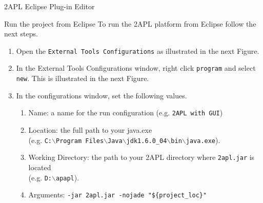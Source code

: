 \begin{chapter}{2APL Eclipse Plug-in Editor}
\begin{section}{Run the project from Eclipse}
    To run the 2APL platform from Eclipse follow the next steps.
    \begin{enumerate}
    \item Open the \texttt{External Tools Configurations} as
    illustrated in the next Figure.
        \begin{figure}[ht]
            \begin{center}
            \end{center}
            \label{fig:runconfiguration}
        \end{figure}

    \item In the External Tools Configurations window, right click \texttt{program} and select
    \texttt{new}. This is illustrated in the next Figure.
        \begin{figure}[ht]
            \begin{center}
            \end{center}\label{fig:runconfiguration1}
        \end{figure}

    \item In the configurations window, set the following values.
        \begin{enumerate}
        \item Name: a name for the run configuration (e.g. \texttt{2APL with GUI})

        \item Location: the full path to your java.exe\\
        (e.g. \texttt{C:$\backslash$Program
        Files$\backslash$Java$\backslash$jdk1.6.0\_04$\backslash$bin$\backslash$java.exe}).

        \item Working Directory: the path to your 2APL directory where {\tt 2apl.jar} is
        located\\
        (e.g. \texttt{D:$\backslash$apapl}).

        \item Arguments: \texttt{-jar 2apl.jar -nojade "\$\{project\_loc\}"}
        \end{enumerate}


\end{enumerate}
\end{section}
\end{chapter}
